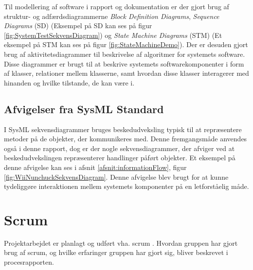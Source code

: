 \noindent Til modellering af software i rapport og dokumentation er der gjort brug af struktur- og adfærdsdiagrammerne \textit{Block Definition Diagrams}, \textit{Sequence Diagrams} (SD) (Eksempel på SD kan ses på figur \ref{fig:SystemTestSekvensDiagram}) og \textit{State Machine Diagrams} (STM) (Et eksempel på STM kan ses på figur \ref{fig:StateMachineDemo}). Der er desuden gjort brug af aktivitetsdiagrammer til beskrivelse af algoritmer for systemets software. Disse diagrammer er brugt til at beskrive systemets softwarekomponenter i form af klasser, relationer mellem klasserne, samt hvordan disse klasser interagerer med hinanden og hvilke tilstande, de kan være i. 

\subsection{Afvigelser fra SysML Standard}
I SysML sekvensdiagrammer bruges beskedudveksling typisk til at repræsentere metoder på de objekter, der kommunikeres med. Denne fremgangsmåde anvendes også i denne rapport, dog er der nogle sekvensdiagrammer, der afviger ved at beskedudvekslingen repræsenterer handlinger påført objekter. Et eksempel på denne afvigelse kan ses i afsnit \ref{afsnit:informationFlow}, figur \ref{fig:WiiNunchuckSekvensDiagram}. Denne afvigelse blev brugt for at kunne tydeliggøre interaktionen mellem systemets komponenter på en letforståelig måde.

\section{Scrum}
Projektarbejdet er planlagt og udført vha. scrum \cite{scrum}. Hvordan gruppen har gjort brug af scrum, og hvilke erfaringer gruppen har gjort sig, bliver beskrevet i procesrapporten.